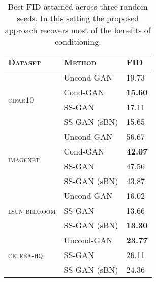 \documentclass[10pt,twocolumn,letterpaper]{article}
\newcommand{\celebahq}{\textsc{celeba-hq}}
\newcommand{\lsun}{\textsc{lsun-bedroom}}
\newcommand{\cifar}{\textsc{cifar10}}
\newcommand{\imagenet}{\textsc{imagenet}}
\begin{document}
\begin{table}[t]
  \centering
  \caption{\label{tab:best_fid} Best FID attained across three random seeds. In this setting the proposed approach recovers most of the benefits of conditioning.\vspace{-5mm}}
  \begin{tabular}{lll}
\toprule
\textsc{Dataset} & \textsc{Method} &  \textsc{FID}   \\
\midrule
\multirow{4}{*}{\cifar} & Uncond-GAN &     19.73 \\
        & Cond-GAN &     \textbf{15.60} \\
        & SS-GAN &     17.11 \\
        & SS-GAN (sBN) &     {15.65} \\ \midrule
\multirow{4}{*}{\imagenet{}} & Uncond-GAN &     56.67 \\
        & Cond-GAN &     \textbf{42.07} \\
        & SS-GAN &     47.56 \\
        & SS-GAN (sBN) &     43.87 \\ \midrule
\multirow{3}{*}{\lsun{}} & Uncond-GAN &     16.02 \\
        & SS-GAN &     13.66 \\
        & SS-GAN (sBN) &     \textbf{13.30} \\ \midrule
\multirow{3}{*}{\celebahq} & Uncond-GAN &     \textbf{23.77} \\
        & SS-GAN &     26.11 \\
        & SS-GAN (sBN) &     24.36 \\
\bottomrule
\end{tabular}
 \end{table}
\end{document}
